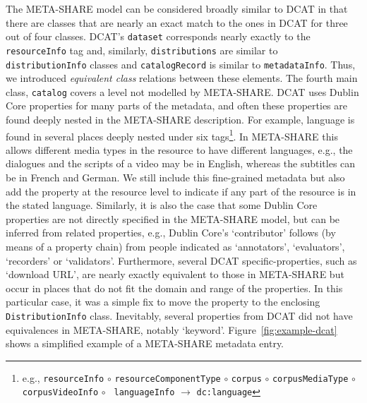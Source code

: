 \documentclass{llncs}
\begin{document}
\label{sec:dcat}
The META-SHARE model can be considered broadly similar to DCAT in that there are
classes that are nearly an exact match to the ones in DCAT for three out of four
classes. DCAT's {\tt dataset} corresponds nearly exactly to the {\tt resourceInfo} tag and, similarly, {\tt distributions} are similar to {\tt distribu\-tionInfo} 
classes and {\tt catalogRecord} is similar to {\tt metadataInfo}. Thus, we
introduced \emph{equivalent class} relations between these elements. The
fourth main class, {\tt catalog} covers a level not modelled by META-SHARE.
DCAT uses Dublin Core properties for many parts of the metadata, and often these
properties are found deeply nested in the META-SHARE description. For example, language
is found in several places deeply nested under six
tags\footnote{e.g., {\tt resourceInfo} $\circ$ {\tt resourceComponentType}
    $\circ$ {\tt corpus} $\circ$ {\tt corpusMediaType} $\circ$ {\tt corpusVideoInfo}
    $\circ$ {\tt
languageInfo} $\rightarrow$ {\tt dc:language}}. In META-SHARE this allows different media types in the resource
to have different languages, e.g., the dialogues and the scripts of a video may
be in English, whereas the subtitles can be in French and German.
We still include this fine-grained metadata but also add the property at the resource level
to indicate if any part of the resource is in the stated language.
Similarly, it is also the case that some Dublin Core properties are not directly
specified in the META-SHARE model, but can be inferred from related properties,
e.g., Dublin Core's `contributor' follows (by means of a property chain) from people indicated as `annotators',
`evaluators', `recorders' or `validators'. Furthermore, several DCAT specific-properties, such as `download URL', are nearly
exactly equivalent to those in META-SHARE but occur in places that do not fit the
domain and range of the properties. In this particular case, it was a simple fix
to move the property to the enclosing {\tt DistributionInfo} class.
Inevitably, several properties from DCAT did not have equivalences in
META-SHARE, notably `keyword'. Figure~\ref{fig:example-dcat} shows a simplified example of a META-SHARE metadata entry.
\end{document}
